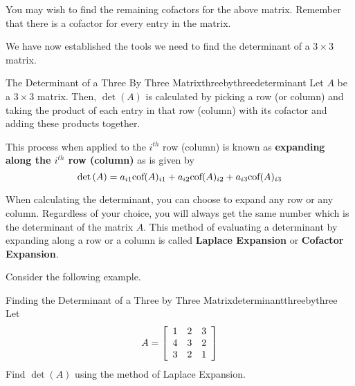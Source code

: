 You may wish to find the remaining cofactors for the above matrix. Remember that there is a cofactor 
for every entry in the matrix.  

We have now established the tools we need to find the determinant of a $3 \times3 $ matrix.

\begin{definition}{The Determinant of a Three By Three Matrix}{threebythreedeterminant}
Let $A$ be a $3\times 3$ matrix. Then, $\det \left(A\right)$ is calculated by picking a row
(or column) and taking the product of each entry in that row (column) with its
cofactor and adding these products together. 

This process when applied to the $i^{th}$
row (column) is known as \textbf{expanding along the $i^{th}$ row
(column)}  as is given by 
\[
\det \left(A\right) = a_{i1}\mbox{cof}(A)_{i1} + a_{i2}\mbox{cof}(A)_{i2} + a_{i3}\mbox{cof}(A)_{i3}
\]

\end{definition}

When calculating the determinant, you can choose to expand any row or any column. Regardless 
of your choice, you will always get the same number which is the determinant of the matrix $A.$ 
This method of evaluating a determinant by expanding along a row or a column is called \textbf{Laplace
Expansion} or \textbf{Cofactor Expansion}.
 

Consider the following example. 

\begin{example}{Finding the Determinant of a Three by Three Matrix}{determinantthreebythree}
Let 
\begin{equation*}
A=\left[
\begin{array}{rrr}
1 & 2 & 3 \\
4 & 3 & 2 \\
3 & 2 & 1
\end{array}
\right] 
\end{equation*}
Find $\det\left(A\right)$ using the method of Laplace Expansion.
\end{example}

